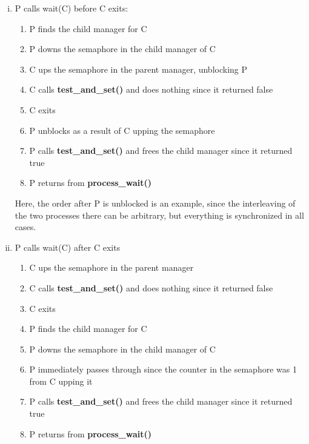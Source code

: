 \documentclass{report}
\newcommand{\fun}[1]{\textcolor{Emerald}{\textbf{#1}}}
\begin{document}
                  \begin{enumerate}[(i)]
                    \item P calls wait(C) before C exits:
                    \begin{enumerate}
                      \item P finds the child manager for C
                      \item P downs the semaphore in the child manager of C
                      \item C ups the semaphore in the parent manager, unblocking P
                      \item C calls \fun{test\_and\_set()} and does nothing since it returned false
                      \item C exits
                      \item P unblocks as a result of C upping the semaphore
                      \item P calls \fun{test\_and\_set()} and frees the child manager since it returned true
                      \item P returns from \fun{process\_wait()}
                    \end{enumerate}
                    Here, the order after P is unblocked is an example, since the interleaving of the two processes there can be arbitrary,
                    but everything is synchronized in all cases.
                    \item P calls wait(C) after C exits
                    \begin{enumerate}
                      \item C ups the semaphore in the parent manager
                      \item C calls \fun{test\_and\_set()} and does nothing since it returned false
                      \item C exits
                      \item P finds the child manager for C
                      \item P downs the semaphore in the child manager of C
                      \item P immediately passes through since the counter in the semaphore was 1 from C upping it
                      \item P calls \fun{test\_and\_set()} and frees the child manager since it returned true
                      \item P returns from \fun{process\_wait()}
                    \end{enumerate}

\end{enumerate}
\end{document}
